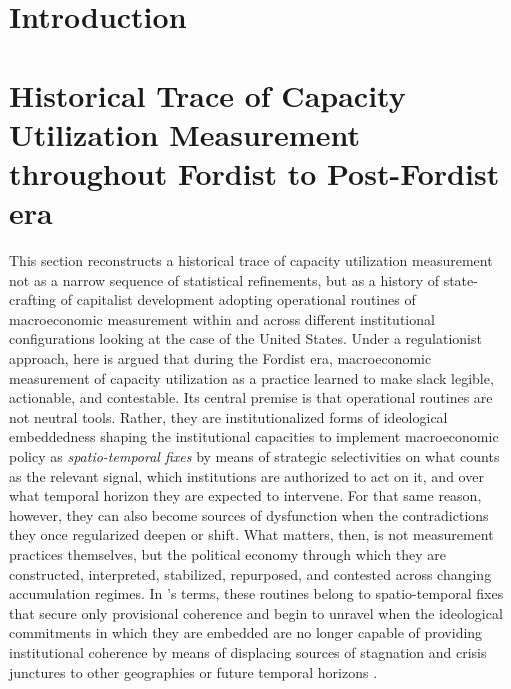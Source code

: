 \documentclass[11pt,a4paper]{article}
\begin{document}
	

\tableofcontents

\pagebreak

\section{Introduction}

\section{Historical Trace of Capacity Utilization Measurement throughout Fordist to Post-Fordist era} 

This section reconstructs a historical trace of capacity utilization measurement not as a narrow sequence of statistical refinements, but as a history of state-crafting of capitalist development adopting operational routines of macroeconomic measurement within and across different institutional configurations looking at the case of the United States. Under a regulationist approach, here is argued that during the Fordist era, macroeconomic measurement of capacity utilization as a practice learned to make slack legible, actionable, and contestable. Its central premise is that operational routines are not neutral tools. Rather, they are institutionalized forms of ideological embeddedness shaping the institutional capacities to implement macroeconomic policy as \textit{spatio-temporal fixes} by means of strategic selectivities on what counts as the relevant signal, which institutions are authorized to act on it, and over what temporal horizon they are expected to intervene. For that same reason, however, they can also become sources of dysfunction when the contradictions they once regularized deepen or shift. What matters, then, is not measurement practices themselves, but the political economy through which they are constructed, interpreted, stabilized, repurposed, and contested across changing accumulation regimes. In \citet{Jessop2003}'s terms, these routines belong to spatio-temporal fixes that secure only provisional coherence and begin to unravel when the ideological commitments in which they are embedded are no longer capable of providing institutional coherence by means of displacing sources of stagnation and crisis junctures to other geographies or future temporal horizons \citep{Jessop2006}. 
\end{document}
